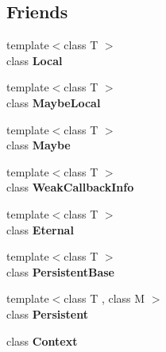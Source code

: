 \subsection*{Friends}
\begin{DoxyCompactItemize}
\item 
\hypertarget{classv8_1_1V8_afb872edb4aac7ba55f0da004113aa2b0}{}{\footnotesize template$<$class T $>$ }\\class {\bfseries Local}\label{classv8_1_1V8_afb872edb4aac7ba55f0da004113aa2b0}

\item 
\hypertarget{classv8_1_1V8_a8c1dab86fc095fca89075da411a82209}{}{\footnotesize template$<$class T $>$ }\\class {\bfseries Maybe\+Local}\label{classv8_1_1V8_a8c1dab86fc095fca89075da411a82209}

\item 
\hypertarget{classv8_1_1V8_ae606ba8c3656041ee7ec7532d02a3bdb}{}{\footnotesize template$<$class T $>$ }\\class {\bfseries Maybe}\label{classv8_1_1V8_ae606ba8c3656041ee7ec7532d02a3bdb}

\item 
\hypertarget{classv8_1_1V8_aeeef5ad4ce5906cf147f93645284ebdf}{}{\footnotesize template$<$class T $>$ }\\class {\bfseries Weak\+Callback\+Info}\label{classv8_1_1V8_aeeef5ad4ce5906cf147f93645284ebdf}

\item 
\hypertarget{classv8_1_1V8_adf5d8780aceb9310fb1246aae7ec348e}{}{\footnotesize template$<$class T $>$ }\\class {\bfseries Eternal}\label{classv8_1_1V8_adf5d8780aceb9310fb1246aae7ec348e}

\item 
\hypertarget{classv8_1_1V8_abb172e0bb22fc5fed7a3a66f29d046ce}{}{\footnotesize template$<$class T $>$ }\\class {\bfseries Persistent\+Base}\label{classv8_1_1V8_abb172e0bb22fc5fed7a3a66f29d046ce}

\item 
\hypertarget{classv8_1_1V8_ad845ec8872174be0a9ca9a3dd1898d30}{}{\footnotesize template$<$class T , class M $>$ }\\class {\bfseries Persistent}\label{classv8_1_1V8_ad845ec8872174be0a9ca9a3dd1898d30}

\item 
\hypertarget{classv8_1_1V8_ac26c806e60ca4a0547680edb68f6e39b}{}class {\bfseries Context}\label{classv8_1_1V8_ac26c806e60ca4a0547680edb68f6e39b}

\end{DoxyCompactItemize}


